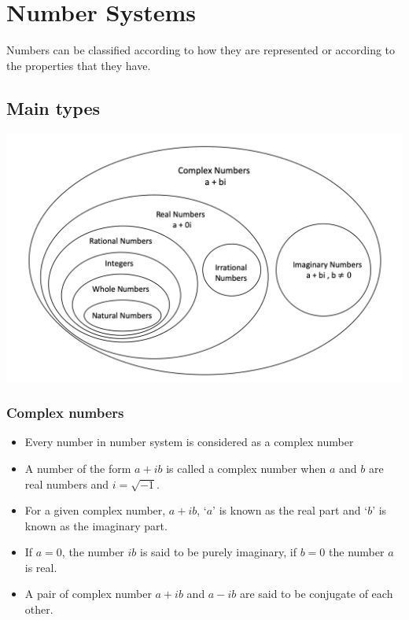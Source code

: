\documentclass[]{book}
\providecommand{\tightlist}{%
  \setlength{\itemsep}{0pt}\setlength{\parskip}{0pt}}
\begin{document}
\hypertarget{number-systems}{%
\chapter{Number Systems}\label{number-systems}}


Numbers can be classified according to how they are represented or according to the properties that they have.

\hypertarget{main-types}{%
\section{Main types}\label{main-types}}

\begin{center}\includegraphics[width=1\linewidth]{figure/1-numbertypes} \end{center}

\hypertarget{complex-numbers}{%
\subsection{Complex numbers}\label{complex-numbers}}

\begin{itemize}
\tightlist
\item
  Every number in number system is considered as a complex number
\item
  A number of the form \(a+ib\) is called a complex number when \(a\) and \(b\) are real numbers and \(i=\sqrt{-1}\).
\item
  For a given complex number, \(a+ib\), `\(a\)' is known as the real part and `\(b\)' is known as the imaginary part.
\item
  If \(a=0\), the number \(ib\) is said to be purely imaginary, if \(b=0\) the number \(a\) is real.
\item
  A pair of complex number \(a+ib\) and \(a-ib\) are said to be conjugate of each other.
\end{itemize}
\end{document}
